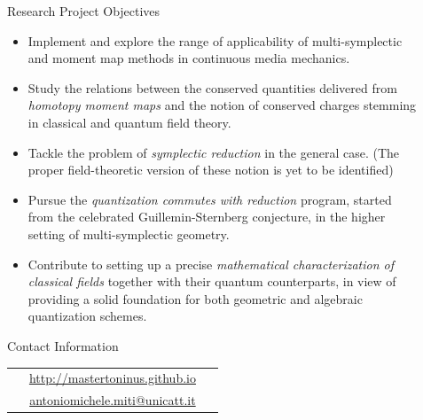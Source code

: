 \documentclass[final,20pt]{beamer}
\newlength{\sepwidinternal}
\newlength{\onecolwid}
\newlength{\threecolwid}
\begin{document}
\begin{frame}[t]
\begin{columns}[t]
\begin{column}{\onecolwid}
		
		\vspace{0.5cm}
		\begin{block}{Research Project Objectives}
		\begin{itemize}
			\item\justifying Implement and explore the range of applicability of multi-symplectic and moment map methods in continuous media mechanics.
			\item\justifying Study the relations between the conserved quantities delivered from \emph{homotopy moment maps} and the notion of conserved charges stemming in classical and quantum field theory.
			\item\justifying Tackle the problem of \emph{symplectic reduction} in the general case. (The proper field-theoretic version of these notion is yet to be identified)
			\item\justifying Pursue the \emph{quantization commutes with reduction} program, started from the celebrated Guillemin-Sternberg conjecture, in the higher setting of multi-symplectic geometry.
			\item\justifying Contribute to setting up a precise \emph{mathematical characterization of classical fields} together with their quantum counterparts, in view of providing a solid foundation for both geometric and algebraic quantization schemes.
		\end{itemize}
		\end{block}


		\vspace{1cm}
		\begin{alertblock}{Contact Information}
		\begin{center}
			\begin{tabular}{c c c}
				\ComputerMouse $\;$ &  \href{http://mastertoninus.github.io}{http://mastertoninus.github.io} & $\;$ \ComputerMouse \\
				\Letter $\;$ & \href{mailto:antoniomichele.miti@unicatt.it}{antoniomichele.miti@unicatt.it} & $\;$ \Letter
			\end{tabular}		
		\end{center}
		\end{alertblock}

	\end{column}


	\begin{column}{\sepwidinternal}\end{column} %
	\begin{column}{\threecolwid} %
		\begin{columns}[t,totalwidth=\threecolwid] %


\end{columns}
\end{column}
\end{columns}
\end{frame}
\end{document}
